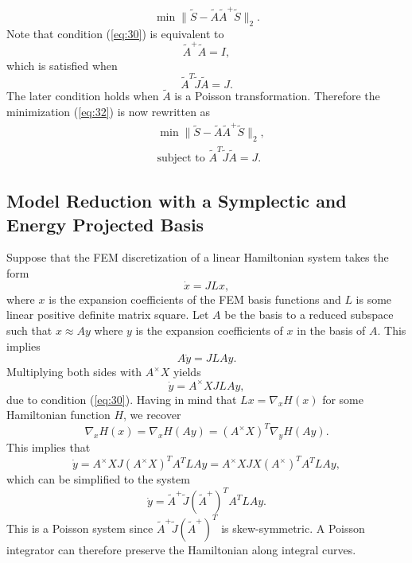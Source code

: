 \documentclass[12pt]{article}
\begin{document}
\begin{equation} \label{eq:34}
	\min \| \tilde S - \tilde A {\tilde A}^+ \tilde S \|_2.
\end{equation}
Note that condition (\ref{eq:30}) is equivalent to
\begin{equation} \label{eq:35}
	{\tilde A}^+ \tilde A = I,
\end{equation}
which is satisfied when
\begin{equation} \label{eq:36}
	\tilde A ^T \tilde J \tilde A = J.
\end{equation}
The later condition holds when $\tilde A$ is a Poisson transformation. Therefore the minimization (\ref{eq:32}) is now rewritten as
\begin{equation}
\begin{aligned}
	& \min \| \tilde S - \tilde A {\tilde A}^+ \tilde S \|_2, \\
	&\text{subject to } \tilde A ^T \tilde J \tilde A = J.
\end{aligned}
\end{equation}

\subsection{Model Reduction with a Symplectic and Energy Projected Basis}
Suppose that the FEM discretization of a linear Hamiltonian system takes the form
\begin{equation}
	\dot x = J L x,
\end{equation}
where $x$ is the expansion coefficients of the FEM basis functions and $L$ is some linear positive definite matrix square. Let $A$ be the basis to a reduced subspace such that $x \approx Ay$ where $y$ is the expansion coefficients of $x$ in the basis of $A$. This implies
\begin{equation}
	A \dot y = J L A y.
\end{equation}
Multiplying both sides with $A^\times X$ yields
\begin{equation}
	\dot y = A^\times X J L A y,
\end{equation}
due to condition (\ref{eq:30}). Having in mind that $L x = \nabla_x H(x)$ for some Hamiltonian function $H$, we recover
\begin{equation}
	\nabla_x H(x) = \nabla_x H(Ay) = ( A^\times X )^T \nabla_y H(Ay).
\end{equation}
This implies that
\begin{equation}
	\dot y = A^\times X J (A^\times X)^T A^T L A y = A^\times X J X (A^\times)^T A^T L A y,
\end{equation}
which can be simplified to the system
\begin{equation}
	\dot y = \tilde A ^+ \tilde J (\tilde A ^+)^T  A^T L A y.
\end{equation}
This is a Poisson system since $\tilde A ^+ \tilde J (\tilde A ^+)^T$ is skew-symmetric. A Poisson integrator can therefore preserve the Hamiltonian along integral curves.
\end{document}
